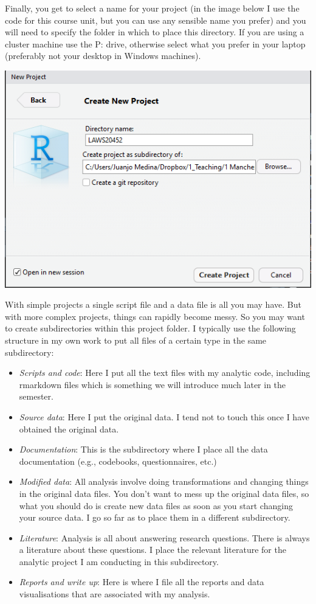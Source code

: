 \documentclass[]{book}
\theoremstyle{definition}
\theoremstyle{definition}
\theoremstyle{definition}
\theoremstyle{remark}
\begin{document}
Finally, you get to select a name for your project (in the image below I
use the code for this course unit, but you can use any sensible name you
prefer) and you will need to specify the folder in which to place this
directory. If you are using a cluster machine use the P: drive,
otherwise select what you prefer in your laptop (preferably not your
desktop in Windows machines).

\includegraphics{imgs/newproject4.PNG}

With simple projects a single script file and a data file is all you may
have. But with more complex projects, things can rapidly become messy.
So you may want to create subdirectories within this project folder. I
typically use the following structure in my own work to put all files of
a certain type in the same subdirectory:

\begin{itemize}
\item
  \emph{Scripts and code}: Here I put all the text files with my
  analytic code, including rmarkdown files which is something we will
  introduce much later in the semester.
\item
  \emph{Source data}: Here I put the original data. I tend not to touch
  this once I have obtained the original data.
\item
  \emph{Documentation}: This is the subdirectory where I place all the
  data documentation (e.g., codebooks, questionnaires, etc.)
\item
  \emph{Modified data}: All analysis involve doing transformations and
  changing things in the original data files. You don't want to mess up
  the original data files, so what you should do is create new data
  files as soon as you start changing your source data. I go so far as
  to place them in a different subdirectory.
\item
  \emph{Literature}: Analysis is all about answering research questions.
  There is always a literature about these questions. I place the
  relevant literature for the analytic project I am conducting in this
  subdirectory.
\item
  \emph{Reports and write up}: Here is where I file all the reports and
  data visualisations that are associated with my analysis.
\end{itemize}
\end{document}
